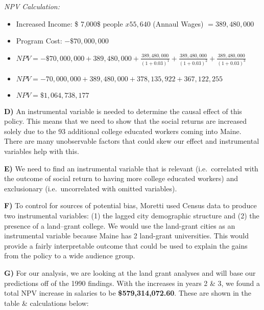 \documentclass[11pt]{article}
\providecommand{\tightlist}{%
      \setlength{\itemsep}{0pt}\setlength{\parskip}{0pt}}
\begin{document}
\emph{NPV Calculation:}

\begin{itemize}
\tightlist
\item
  Increased Income: \$ 7,000\$ people \(x 55,640\) (Annaul Wages)
  \(= 389,480,000\)
\item
  Program Cost: \(-\$70,000,000\)
\item
  \(NPV = -\$70,000,000 + 389,480,000 + \frac{389,480,000}{(1+0.03)^1} + \frac{389,480,000}{(1+0.03)^2} + \frac{389,480,000}{(1+0.03)^3}\)
\item
  \(NPV = -70,000,000 + 389,480,000 + 378,135,922 + 367,122,255\) 
\item
  \(NPV = \$1,064,738,177\)
\end{itemize}

\textbf{D)} An instrumental variable is needed to determine the causal
effect of this policy. This means that we need to show that the social
returns are increased solely due to the 93 additional college educated
workers coming into Maine. There are many unobservable factors that
could skew our effect and instrumental variables help with this.

\textbf{E)} We need to find an instrumental variable that is relevant
(i.e.~correlated with the outcome of social return to having more
college educated workers) and exclusionary (i.e.~uncorrelated with
omitted variables).

\textbf{F)} To control for sources of potential bias, Moretti used
Census data to produce two instrumental variables: (1) the lagged city
demographic structure and (2) the presence of a land--grant college. We
would use the land-grant cities as an instrumental variable because
Maine has 2 land-grant universities. This would provide a fairly
interpretable outcome that could be used to explain the gains from the
policy to a wide audience group.

\textbf{G)} For our analysis, we are looking at the land grant analyses
and will base our predictions off of the 1990 findings. With the
increases in years 2 \& 3, we found a total NPV increase in salaries to
be \textbf{\$579,314,072.60}. These are shown in the table \&
calculations below:
\end{document}
